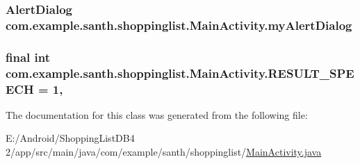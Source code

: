 \subsubsection[{\texorpdfstring{my\+Alert\+Dialog}{myAlertDialog}}]{\setlength{\rightskip}{0pt plus 5cm}Alert\+Dialog com.\+example.\+santh.\+shoppinglist.\+Main\+Activity.\+my\+Alert\+Dialog}\hypertarget{classcom_1_1example_1_1santh_1_1shoppinglist_1_1_main_activity_ab059477f916af817596e0bd4f3f54e29}{}\label{classcom_1_1example_1_1santh_1_1shoppinglist_1_1_main_activity_ab059477f916af817596e0bd4f3f54e29}
\subsubsection[{\texorpdfstring{R\+E\+S\+U\+L\+T\+\_\+\+S\+P\+E\+E\+CH}{RESULT_SPEECH}}]{\setlength{\rightskip}{0pt plus 5cm}final int com.\+example.\+santh.\+shoppinglist.\+Main\+Activity.\+R\+E\+S\+U\+L\+T\+\_\+\+S\+P\+E\+E\+CH = 1\hspace{0.3cm}{\ttfamily [static]}, {\ttfamily [protected]}}\hypertarget{classcom_1_1example_1_1santh_1_1shoppinglist_1_1_main_activity_a4f358ad66f8020173b2bac71b406a1d5}{}\label{classcom_1_1example_1_1santh_1_1shoppinglist_1_1_main_activity_a4f358ad66f8020173b2bac71b406a1d5}


The documentation for this class was generated from the following file\+:\begin{DoxyCompactItemize}
\item 
E\+:/\+Android/\+Shopping\+List\+D\+B4 2/app/src/main/java/com/example/santh/shoppinglist/\hyperlink{_main_activity_8java}{Main\+Activity.\+java}\end{DoxyCompactItemize}
